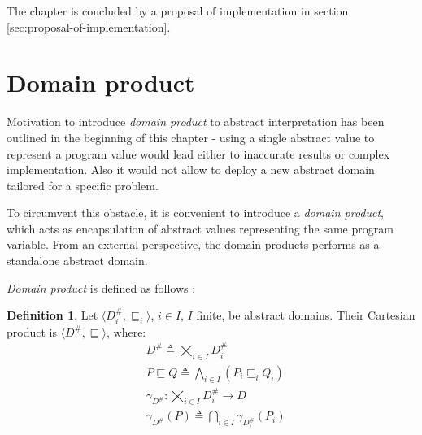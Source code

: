 \documentclass[12pt,oneside]{fithesis2}
\theoremstyle{definition}
\newtheorem{definition}{Definition}
\begin{document}
The chapter is concluded by a proposal of implementation in section \ref{sec:proposal-of-implementation}.




\section{Domain product}\label{sec:domain-product}

Motivation to introduce \textit{domain product} to abstract interpretation has been outlined in the beginning of this chapter - using a single abstract value to represent a program value would lead either to inaccurate results or complex implementation. Also it would not allow to deploy a new abstract domain tailored for a specific problem. \cite{CousotEtAl06-ASIAN}

To circumvent this obstacle, it is convenient to introduce a \textit{domain product}, which acts as encapsulation of abstract values representing the same program variable. From an external perspective, the domain products performs as a standalone abstract domain.

\textit{Domain product} is defined as follows \cite{CousotCousotMauborgne-FoSSaCS-11}:

\begin{definition}
  Let $\langle D^\#_i, \sqsubseteq_i \rangle$, $i \in I$, $I$ finite, be abstract domains. Their Cartesian product is $\langle D^\#, \sqsubseteq \rangle$, where:
  \begin{align*}
    &D^\# \triangleq \bigtimes_{i \in I} D^\#_i\\
    &P \sqsubseteq Q \triangleq \bigwedge_{i \in I}\left(P_i \sqsubseteq_i Q_i \right)\\
    &\gamma_{D^\#}: \bigtimes_{i \in I} D^\#_i \to D\\
    &\gamma_{D^\#}(P) \triangleq \bigcap_{i \in I} \gamma_{D^\#_i}\left( P_i \right)
  \end{align*}
\end{definition}
\end{document}
